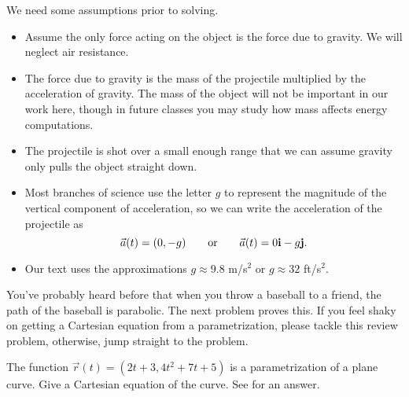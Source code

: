 We need some assumptions prior to solving. 
\begin{itemize}
 \item Assume the only force acting on the object is the force due to gravity. We will neglect air resistance. 
 \item The force due to gravity is the mass of the projectile multiplied by the acceleration of gravity. The mass of the object will not be important in our work here, though in future classes you may study how mass affects energy computations. 
 \item The projectile is shot over a small enough range that we can assume gravity only pulls the object straight down.
 \item Most branches of science use the letter $g$ to represent the magnitude of the vertical component of acceleration, so we can write the acceleration of the projectile as 
$$\vec a(t) = (0,-g) \quad \quad \text{or}\quad \quad \vec a(t)= 0{\bf i}-g{\bf j}.$$ 
 \item Our text uses the approximations $g\approx 9.8$ m/s$^2$ or $g\approx32$ ft/s$^2$. 
\end{itemize}


You've probably heard before that when you throw a baseball to a friend, the path of the baseball is parabolic. The next problem proves this. If you feel shaky on getting a Cartesian equation from a parametrization, please tackle this review problem, otherwise, jump straight to the problem.
\begin{review*}
 The function $\vec r(t) = (2t+3, 4t^2+7t+5)$ is a parametrization of a plane curve.  Give a Cartesian equation of the curve. 
 See  for an answer.
\end{review*}


